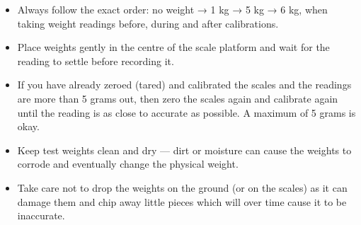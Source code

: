 \documentclass[
  letterpaper,
]{scrbook}
\begin{document}
\begin{tcolorbox}[enhanced jigsaw, left=2mm, toptitle=1mm, breakable, opacitybacktitle=0.6, title=\textcolor{quarto-callout-note-color}{\faInfo}\hspace{0.5em}{Note}, colback=white, opacityback=0, rightrule=.15mm, leftrule=.75mm, colbacktitle=quarto-callout-note-color!10!white, bottomtitle=1mm, titlerule=0mm, coltitle=black, colframe=quarto-callout-note-color-frame, arc=.35mm, bottomrule=.15mm, toprule=.15mm]

\begin{itemize}
\item
  Always follow the exact order: no weight → 1 kg → 5 kg → 6 kg, when
  taking weight readings before, during and after calibrations.
\item
  Place weights gently in the centre of the scale platform and wait for
  the reading to settle before recording it.
\item
  If you have already zeroed (tared) and calibrated the scales and the
  readings are more than 5 grams out, then zero the scales again and
  calibrate again until the reading is as close to accurate as possible.
  A maximum of 5 grams is okay.
\item
  Keep test weights clean and dry --- dirt or moisture can cause the
  weights to corrode and eventually change the physical weight.
\item
  Take care not to drop the weights on the ground (or on the scales) as
  it can damage them and chip away little pieces which will over time
  cause it to be inaccurate.
\end{itemize}

\end{tcolorbox}
\end{document}
